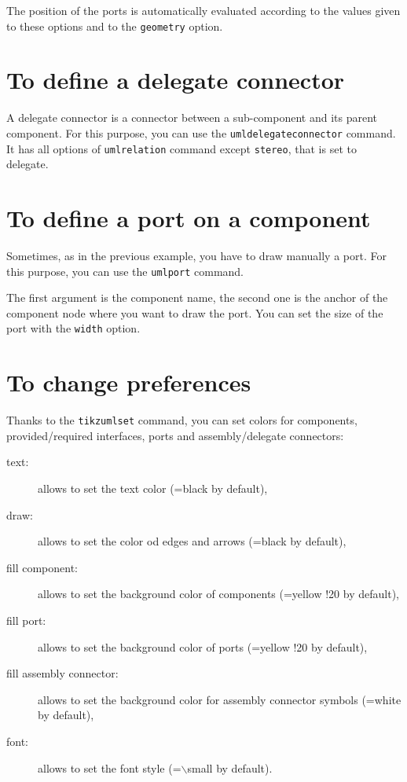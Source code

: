 \documentclass[a4paper,11pt]{report}
\begin{document}
\medskip

The position of the ports is automatically evaluated according to the values given to these options and to the {\tt geometry} option.

\section{To define a delegate connector}

A delegate connector is a connector between a sub-component and its parent component. For this purpose, you can use the {\tt umldelegateconnector} command. It has all options of {\tt umlrelation} command except {\tt stereo}, that is set to delegate.

\medskip

\begin{minipage}{0.45\textwidth}

\end{minipage}
\begin{minipage}{0.55\textwidth}
\begin{center}
\end{center}
\end{minipage}

\medskip

\section{To define a port on a component}

Sometimes, as in the previous example, you have to draw manually a port. For this purpose, you can use the {\tt umlport} command.

The first argument is the component name, the second one is the anchor of the component node where you want to draw the port. You can set the size of the port with the {\tt width} option.

\section{To change preferences}

Thanks to the {\tt tikzumlset} command, you can set colors for components, provided/required interfaces, ports and assembly/delegate connectors:

\begin{description}
\item[text:] allows to set the text color (=black by default),
\item[draw:] allows to set the color od edges and arrows (=black by default),
\item[fill component:] allows to set the background color of components (=yellow !20 by default),
\item[fill port:] allows to set the background color of ports (=yellow !20 by default),
\item[fill assembly connector:] allows to set the background color for assembly connector symbols (=white by default),
\item[font:] allows to set the font style (=$\backslash$small by default).
\end{description}
\end{document}
